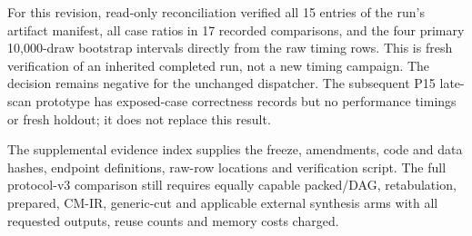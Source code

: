 For this revision, read-only reconciliation verified all 15 entries of the
run's artifact manifest, all case ratios in 17 recorded comparisons, and the
four primary 10,000-draw bootstrap intervals directly from the raw timing
rows. This is fresh verification of an inherited completed run, not a new
timing campaign. The decision remains negative for the unchanged dispatcher.
The subsequent P15 late-scan prototype has exposed-case correctness records
but no performance timings or fresh holdout; it does not replace this result.

The supplemental evidence index supplies the freeze, amendments, code and
data hashes, endpoint definitions, raw-row locations and verification script.
The full protocol-v3 comparison still requires equally capable packed/DAG,
retabulation, prepared, CM-IR, generic-cut and applicable external synthesis
arms with all requested outputs, reuse counts and memory costs charged.
